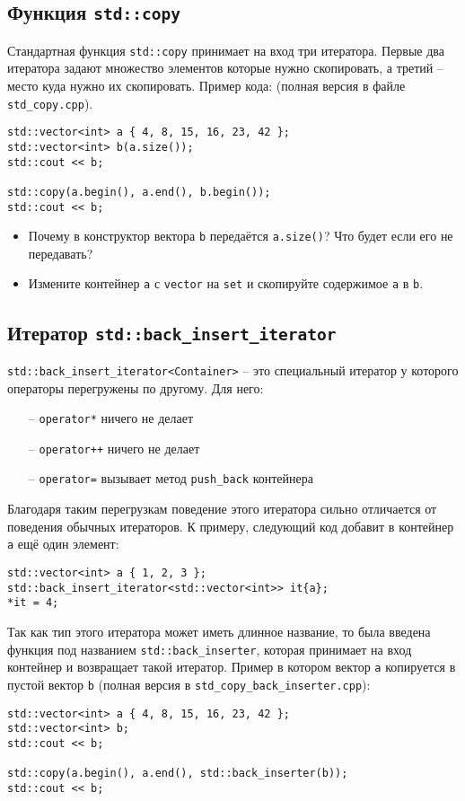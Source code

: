 \documentclass{article}
\begin{document}
\subsection*{Функция \texttt{std::copy}}
Стандартная функция \texttt{std::copy} принимает на вход три итератора. Первые два итератора задают множество элементов которые нужно скопировать, а третий -- место куда нужно их скопировать. Пример кода: (полная версия в файле \texttt{std\_copy.cpp}).
\begin{lstlisting}
std::vector<int> a { 4, 8, 15, 16, 23, 42 };
std::vector<int> b(a.size());
std::cout << b;

std::copy(a.begin(), a.end(), b.begin());
std::cout << b;
\end{lstlisting}
\begin{itemize}
\item Почему в конструктор вектора \texttt{b} передаётся \texttt{a.size()}? Что будет если его не передавать?
\item Измените контейнер \texttt{a} с \texttt{vector} на \texttt{set} и скопируйте содержимое \texttt{a} в \texttt{b}.
\end{itemize}


\subsection*{Итератор \texttt{std::back\_insert\_iterator}}
\texttt{std::back\_insert\_iterator<Container>} -- это специальный итератор у которого операторы перегружены по другому. Для него:
\begin{itemize}
\item[--] \texttt{operator*} ничего не делает
\item[--] \texttt{operator++} ничего не делает
\item[--] \texttt{operator=} вызывает метод \texttt{push\_back} контейнера
\end{itemize}

Благодаря таким перегрузкам поведение этого итератора сильно отличается от поведения обычных итераторов. К примеру, следующий код добавит в контейнер \texttt{a} ещё один элемент:
\begin{lstlisting}
std::vector<int> a { 1, 2, 3 };
std::back_insert_iterator<std::vector<int>> it{a};
*it = 4;
\end{lstlisting}

Так как тип этого итератора может иметь длинное название, то была введена функция под названием \texttt{std::back\_inserter}, которая принимает на вход контейнер и возвращает такой итератор. Пример в котором вектор \texttt{a} копируется в пустой вектор \texttt{b} (полная версия в \texttt{std\_copy\_back\_inserter.cpp}):
\begin{lstlisting}
std::vector<int> a { 4, 8, 15, 16, 23, 42 };
std::vector<int> b;
std::cout << b;

std::copy(a.begin(), a.end(), std::back_inserter(b));
std::cout << b;
\end{lstlisting}
\end{document}
